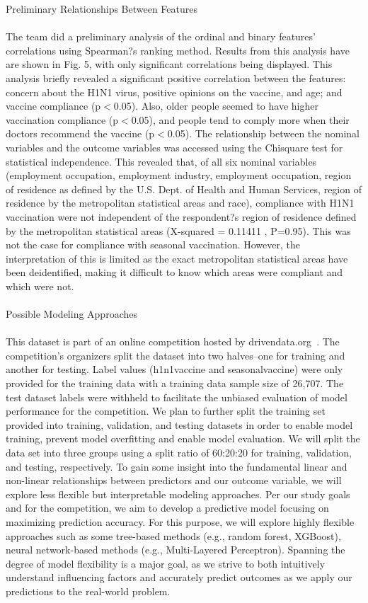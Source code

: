 \documentclass{IEEEtran}
\begin{document}
\begin{@twocolumnfalse}
{\huge Preliminary Relationships Between Features}\\\\
The team did a preliminary analysis of the ordinal and binary features' correlations using Spearman?s ranking method. Results from this analysis have are shown in Fig. 5, with only significant correlations being displayed. This analysis briefly revealed a significant positive correlation between the features: concern about the H1N1 virus, positive opinions on the vaccine, and age; and vaccine compliance (p$<$0.05). Also, older people seemed to have higher vaccination compliance (p$<$0.05), and people tend to comply more when their doctors recommend the vaccine (p$<$0.05). The relationship between the nominal variables and the outcome variables was accessed using the Chisquare test for statistical independence. This revealed that, of all six nominal variables (employment occupation, employment industry, employment occupation, region of residence as defined by the U.S. Dept. of Health and Human Services, region of residence by the metropolitan statistical areas and race), compliance with H1N1 vaccination were not independent of the respondent?s region of residence defined by the metropolitan statistical areas (X-squared = 0.11411 , P=0.95). This was not the case for compliance with seasonal vaccination. However, the interpretation of this is limited as the exact metropolitan statistical areas have been deidentified, making it difficult to know which areas were compliant and which were not.\\\\
{\huge Possible Modeling Approaches}\\\\
This dataset is part of an online competition hosted by drivendata.org~\cite{drivendata}. The competition's organizers split the dataset into two halves--one for training and another for testing. Label values (h1n1\textunderscore vaccine and seasonal\textunderscore vaccine) were only provided for the training data with a training data sample size of 26,707. The test dataset labels were withheld to facilitate the unbiased evaluation of model performance for the competition. We plan to further split the training set provided into training, validation, and testing datasets in order to enable model training, prevent model overfitting and enable model evaluation. We will split the data set into three groups using a split ratio of 60:20:20 for training, validation, and testing, respectively. 
To gain some insight into the fundamental linear and non-linear relationships between predictors and our outcome variable, we will explore less flexible but interpretable modeling approaches. Per our study goals and for the competition, we aim to develop a predictive model focusing on maximizing prediction accuracy. For this purpose, we will explore highly flexible approaches such as some tree-based methods (e.g., random forest, XGBoost), neural network-based methods (e.g., Multi-Layered Perceptron). Spanning the degree of model flexibility is a major goal, as we strive to both intuitively understand influencing factors and accurately predict outcomes as we apply our predictions to the real-world problem.\\\\ 

\end{@twocolumnfalse}
\end{document}

